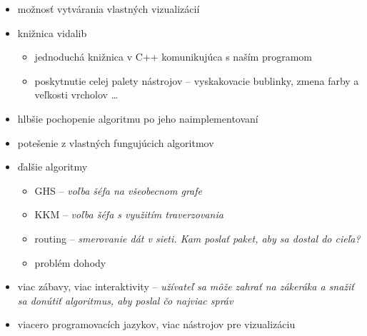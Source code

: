 
\begin{itemize}

    \item možnosť vytvárania vlastných vizualizácií
    \item knižnica vidalib
        \begin{itemize}
            \item jednoduchá knižnica v C++ komunikujúca s naším programom
            \item poskytnutie celej palety nástrojov -- vyskakovacie bublinky, zmena farby a
            veľkosti vrcholov \dots
        \end{itemize}
    \item hlbšie pochopenie algoritmu po jeho naimplementovaní
    \item potešenie z vlastných fungujúcich algoritmov

\end{itemize}




\begin{itemize}
    \item ďalšie algoritmy
    \begin{itemize}
        \item GHS -- \emph{voľba šéfa na všeobecnom grafe}
        \item KKM -- \emph{voľba šéfa s využitím traverzovania}
        \item routing -- \emph{smerovanie dát v sieti. Kam poslať paket, aby sa dostal do cieľa?}
        \item problém dohody
    \end{itemize}
    \item viac zábavy, viac interaktivity -- \emph{užívateľ sa môže zahrať na zákeráka a snažiť sa
    donútiť algoritmus, aby poslal čo najviac správ}
    \item viacero programovacích jazykov, viac nástrojov pre vizualizáciu
\end{itemize}

